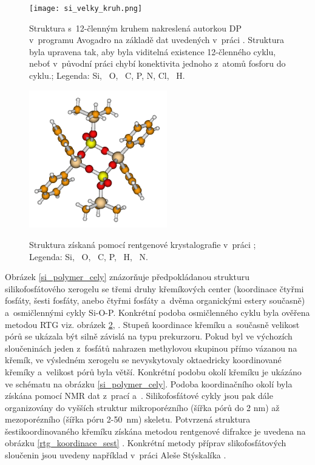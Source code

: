 \documentclass[
digital, %
table,   %
lof,     %
lot,     %
oneside,
]{fithesis3}
\begin{document}
\begin{figure}
\caption{Struktura s~12-členným kruhem nakreslená autorkou DP v~programu Avogadro na základě dat uvedených v~práci \cite{velky_cyklus}.  Struktura byla upravena tak, aby byla viditelná existence 12-členného cyklu, neboť v~původní práci chybí konektivita jednoho z~atomů fosforu do cyklu.;  Legenda:  Si, ~O, ~C,  P,  N,  Cl, ~H.}
\center \texttt{[image: si\_velky\_kruh.png]} \label{velky_cyklus} \end{figure}

\begin{figure}
\caption{Struktura \ce{[(Ph2Si{O2P(O)OSiMe3})2]} získaná pomocí rentgenové krystalografie v~práci \cite{rtg_4_pinkas}; Legenda:  Si, ~O, ~C,  P, ~H, ~N.}
\center \includegraphics[width=6cm]{rtg_kruh_samostatne.png} \label{rtg_cyklus} \end{figure}
Obrázek \ref{si_polymer_cely} znázorňuje předpokládanou strukturu silikofosfátového xerogelu se třemi druhy křemíkových center (koordinace čtyřmi fosfáty, šesti fosfáty, anebo čtyřmi fosfáty a~dvěma organickými estery současně) a~osmičlennými cykly Si-O-P.  Konkrétní podoba osmičlenného cyklu byla ověřena metodou RTG viz. obrázek \ref{rtg_cyklus}, \cite{rtg_4_pinkas}. Stupeň koordinace křemíku a~současně velikost pórů se ukázala být silně závislá na typu prekurzoru. Pokud byl ve výchozích sloučeninách jeden z~fosfátů nahrazen methylovou skupinou přímo vázanou na křemík, ve výsledném xerogelu se nevyskytovaly oktaedricky koordinované křemíky a~velikost pórů byla větší. Konkrétní podobu okolí křemíku je ukázáno ve schématu na obrázku \ref{si_polymer_cely}. Podoba koordinačního okolí byla získána pomocí NMR dat z~prací \cite{rtg_4_pinkas} a~\cite{Styskalik2015thesis}. Silikofosfátové cykly jsou pak dále organizovány do vyšších struktur mikroporézního (šířka pórů do 2 nm) až mezoporézního (šířka póru 2-50~nm) skeletu. Potvrzená struktura šestikoordinovaného křemíku získána metodou rentgenové difrakce je uvedena na obrázku \ref{rtg_koordinace_sest} \cite{C3NJ00721A}. Konkrétní metody příprav slikofosfátových sloučenin jsou uvedeny například v~práci Aleše Stýskalíka \cite{Styskalik2015thesis}.
\end{document}
